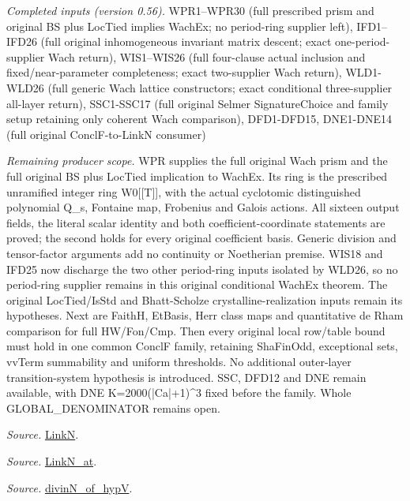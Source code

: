 \emph{Completed inputs (version 0.56).} WPR1–WPR30 (full prescribed prism and original BS plus LocTied implies WachEx; no period-ring supplier left), IFD1–IFD26 (full original inhomogeneous invariant matrix descent; exact one-period-supplier Wach return), WIS1–WIS26 (full four-clause actual inclusion and fixed/near-parameter completeness; exact two-supplier Wach return), WLD1-WLD26 (full generic Wach lattice constructors; exact conditional three-supplier all-layer return), SSC1-SSC17 (full original Selmer SignatureChoice and family setup retaining only coherent Wach comparison), DFD1-DFD15, DNE1-DNE14 (full original ConclF-to-LinkN consumer)

\emph{Remaining producer scope.} WPR supplies the full original Wach prism and the full original BS plus LocTied implication to WachEx. Its ring is the prescribed unramified integer ring W0[[T]], with the actual cyclotomic distinguished polynomial Q\_\allowbreak s, Fontaine map, Frobenius and Galois actions. All sixteen output fields, the literal scalar identity and both coefficient-coordinate statements are proved; the second holds for every original coefficient basis. Generic division and tensor-factor arguments add no continuity or Noetherian premise. WIS18 and IFD25 now discharge the two other period-ring inputs isolated by WLD26, so no period-ring supplier remains in this original conditional WachEx theorem. The original LocTied/IsStd and Bhatt-Scholze crystalline-realization inputs remain its hypotheses. Next are FaithH, EtBasis, Herr class maps and quantitative de Rham comparison for full HW/Fon/Cmp. Then every original local row/table bound must hold in one common ConclF family, retaining ShaFinOdd, exceptional sets, vvTerm summability and uniform thresholds. No additional outer-layer transition-system hypothesis is introduced. SSC, DFD12 and DNE remain available, with DNE K=2000(|Ca|+1)\textasciicircum{}3 fixed before the family. Whole GLOBAL\_\allowbreak DENOMINATOR remains open.

\emph{Source.} \href{https://github.com/CocoSgt/riemann-hypothesis-lean/blob/7cbf7a0c32fca1badf05931879a37c3f8a2b03b4/src/Formalism/SharpRestriction/GlobalTheoremInputs.lean#L45-L48}{LinkN}.

\emph{Source.} \href{https://github.com/CocoSgt/riemann-hypothesis-lean/blob/7cbf7a0c32fca1badf05931879a37c3f8a2b03b4/src/Formalism/SharpRestriction/GlobalTheoremInputs.lean#L40-L44}{LinkN\_\allowbreak at}.

\emph{Source.} \href{https://github.com/CocoSgt/riemann-hypothesis-lean/blob/7cbf7a0c32fca1badf05931879a37c3f8a2b03b4/src/Development/AutomorphicArithmetic/CharacterBoxes/DivinNOfHypV.lean#L117-L134}{divinN\_\allowbreak of\_\allowbreak hypV}.




